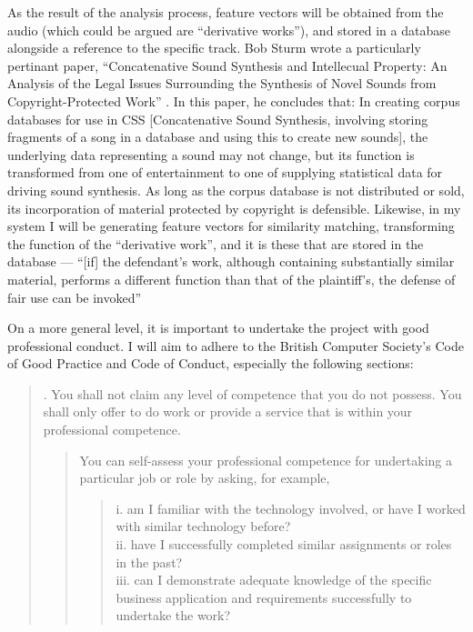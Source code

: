 As the result of the analysis process, feature vectors will be obtained from the
audio (which could be argued are ``derivative works''), and stored in a database
alongside a reference to the specific track. Bob Sturm wrote a particularly
pertinant paper, ``Concatenative Sound Synthesis and Intellecual Property: An
Analysis of the Legal Issues Surrounding the Synthesis of Novel Sounds from
Copyright-Protected Work'' \citep{Sturm2006}. In this paper, he concludes that:
In creating corpus databases for use in CSS [Concatenative Sound
Synthesis, involving storing fragments of a song in a database and
using this to create new sounds], the underlying data representing a
sound may not change, but its function is transformed from one of
entertainment to one of supplying statistical data for driving sound
synthesis. As long as the corpus database is not distributed or sold,
its incorporation of material protected by copyright is defensible.
Likewise, in my system I will be generating feature vectors for similarity matching, transforming the function of the ``derivative work'', and it is these that
are stored in the database — ``[if] the defendant's work, although containing
substantially similar material, performs a different function than that of the
plaintiff's, the defense of fair use can be invoked'' \citep{Copyright1988}

On a more general level, it is important to undertake the project with good
professional conduct. I will aim to adhere to the British Computer Society's
Code of Good Practice and Code of Conduct, especially the following sections:
\begin{quotation}. You shall not claim any level of competence that you do not
possess. You shall only offer to do work or provide a service that is
within your professional competence.
\begin{quotation}\noindent
You can self-assess your professional competence for undertaking a particular job or role by asking, for example,
\begin{quotation}\noindent
i. am I familiar with the technology involved, or have I worked with
similar technology before?\\
ii. have I successfully completed similar assignments or roles in the
past?\\
iii. can I demonstrate adequate knowledge of the specific business
application and requirements successfully to undertake the work?
\end{quotation}
\end{quotation}
\end{quotation}
